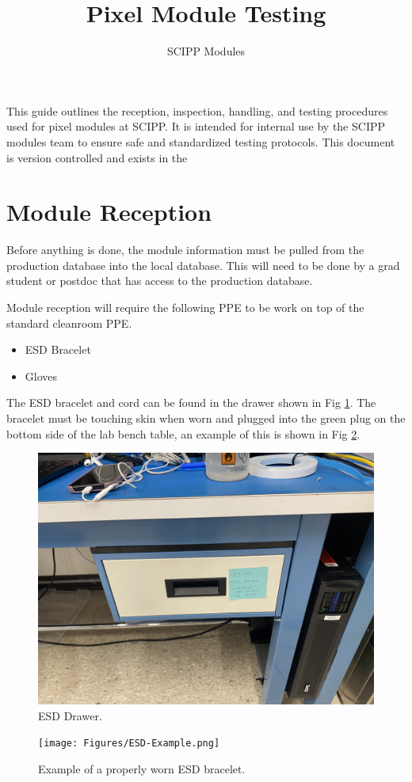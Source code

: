 \documentclass[12pt]{article}
\title{Pixel Module Testing}
\author{SCIPP Modules}
\begin{document}
\maketitle
This guide outlines the reception, inspection, handling, and testing procedures used for pixel modules at SCIPP. It is intended for internal use by the SCIPP modules team to ensure safe and standardized testing protocols. This document is version controlled and exists in the 
\newpage
\tableofcontents
\newpage 
\section{Module Reception}
\label{sec:recieve}

Before anything is done, the module information must be pulled from the production database into the local database. This will need to be done by a grad student or postdoc that has access to the production database. 

Module reception will require the following PPE to be work on top of the standard cleanroom PPE. 
\begin{itemize}
    \item ESD Bracelet
    \item Gloves
\end{itemize}
The ESD bracelet and cord can be found in the drawer shown in Fig \ref{fig:ESD-Drawer}. The bracelet must be touching skin when worn and plugged into the green plug on the bottom side of the lab bench table, an example of this is shown in Fig \ref{fig:esd-example}.
\begin{figure}[H]
    \centering
    \includegraphics[width=0.5\linewidth]{Figures/ESD_drawer.jpg}
    \caption{ESD Drawer.}
    \label{fig:ESD-Drawer}
\end{figure}
\begin{figure}[H]
    \centering
    \texttt{[image: Figures/ESD-Example.png]}
    \caption{Example of a properly worn ESD bracelet.}
    \label{fig:esd-example}
\end{figure}
\end{document}
